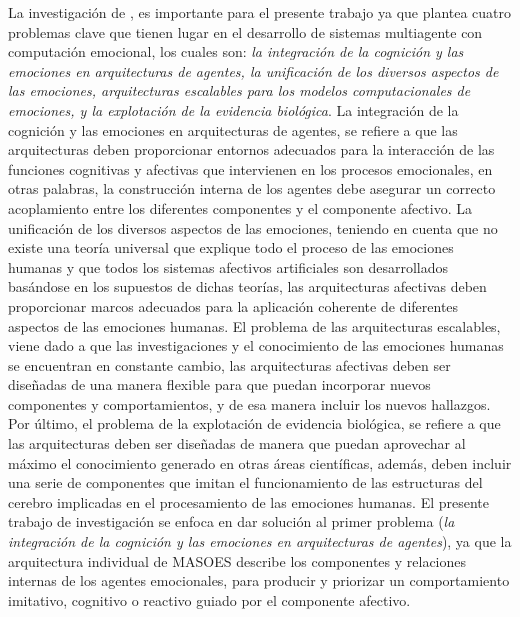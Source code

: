 %
%
%



La investigación de \cite{rodriguez2015}, es importante para el presente
trabajo ya que plantea cuatro problemas clave que tienen lugar en el desarrollo
de sistemas multiagente con computación emocional, los cuales son: \textit{la
integración de la cognición y las emociones en arquitecturas de agentes, la
unificación de los diversos aspectos de las emociones, arquitecturas escalables
para los modelos computacionales de emociones, y la explotación de la evidencia
biológica}. La integración de la cognición y las emociones en arquitecturas de
agentes, se refiere a que las arquitecturas deben proporcionar entornos
adecuados para la interacción de las funciones cognitivas y afectivas que
intervienen en los procesos emocionales, en otras palabras, la construcción
interna de los agentes debe asegurar un correcto acoplamiento entre los
diferentes componentes y el componente afectivo. La unificación de los diversos
aspectos de las emociones, teniendo en cuenta que no existe una teoría universal
que explique todo el proceso de las emociones humanas y que todos los sistemas
afectivos artificiales son desarrollados basándose en los supuestos de dichas
teorías, las arquitecturas afectivas deben proporcionar marcos adecuados para la
aplicación coherente de diferentes aspectos de las emociones humanas. El
problema de las arquitecturas escalables, viene dado a que las investigaciones y
el conocimiento de las emociones humanas se encuentran en constante cambio, las
arquitecturas afectivas deben ser diseñadas de una manera flexible para que
puedan incorporar nuevos componentes y comportamientos, y de esa manera incluir
los nuevos hallazgos. Por último, el problema de la explotación de evidencia
biológica, se refiere a que las arquitecturas deben ser diseñadas de manera que
puedan aprovechar al máximo el conocimiento generado en otras áreas científicas,
además, deben incluir una serie de componentes que imitan el funcionamiento de
las estructuras del cerebro implicadas en el procesamiento de las emociones
humanas. El presente trabajo de investigación
se enfoca en dar solución al primer problema (\textit{la
integración de la cognición y las emociones en arquitecturas de agentes}),
ya que la arquitectura individual de MASOES
describe los componentes y relaciones internas de los agentes emocionales,
para producir y priorizar un comportamiento imitativo, cognitivo o reactivo
guiado por el componente afectivo.

